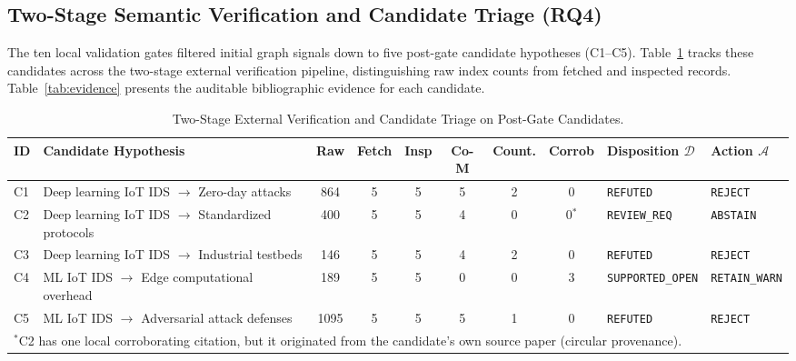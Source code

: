 \documentclass[runningheads]{llncs}
\begin{document}
\subsection{Two-Stage Semantic Verification and Candidate Triage (RQ4)}
The ten local validation gates filtered initial graph signals down to five post-gate candidate hypotheses (C1--C5). Table~\ref{tab:triage} tracks these candidates across the two-stage external verification pipeline, distinguishing raw index counts from fetched and inspected records. Table~\ref{tab:evidence} presents the auditable bibliographic evidence for each candidate.

\begin{table}[htbp]
\centering
\caption{Two-Stage External Verification and Candidate Triage on Post-Gate Candidates.}
\label{tab:triage}
\scriptsize
\setlength{\tabcolsep}{2.0pt}
\begin{tabular}{p{0.5cm}p{2.6cm}ccccccp{1.7cm}p{1.3cm}}
\toprule
\textbf{ID} & \textbf{Candidate Hypothesis} & \textbf{Raw} & \textbf{Fetch} & \textbf{Insp} & \textbf{Co-M} & \textbf{Count.} & \textbf{Corrob} & \textbf{Disposition $\mathcal{D}$} & \textbf{Action $\mathcal{A}$} \\
\midrule
C1 & Deep learning IoT IDS $\rightarrow$ Zero-day attacks & 864 & 5 & 5 & 5 & 2 & 0 & \texttt{REFUTED} & \texttt{REJECT} \\
C2 & Deep learning IoT IDS $\rightarrow$ Standardized protocols & 400 & 5 & 5 & 4 & 0 & 0$^*$ & \texttt{REVIEW\_REQ} & \texttt{ABSTAIN} \\
C3 & Deep learning IoT IDS $\rightarrow$ Industrial testbeds & 146 & 5 & 5 & 4 & 2 & 0 & \texttt{REFUTED} & \texttt{REJECT} \\
C4 & ML IoT IDS $\rightarrow$ Edge computational overhead & 189 & 5 & 5 & 0 & 0 & 3 & \texttt{SUPPORTED\_}\allowbreak\texttt{OPEN} & \texttt{RETAIN\_}\allowbreak\texttt{WARN} \\
C5 & ML IoT IDS $\rightarrow$ Adversarial attack defenses & 1095 & 5 & 5 & 5 & 1 & 0 & \texttt{REFUTED} & \texttt{REJECT} \\
\bottomrule
\multicolumn{10}{p{11.5cm}}{\tiny $^*$C2 has one local corroborating citation, but it originated from the candidate's own source paper (circular provenance).}
\end{tabular}
\end{table}
\end{document}
